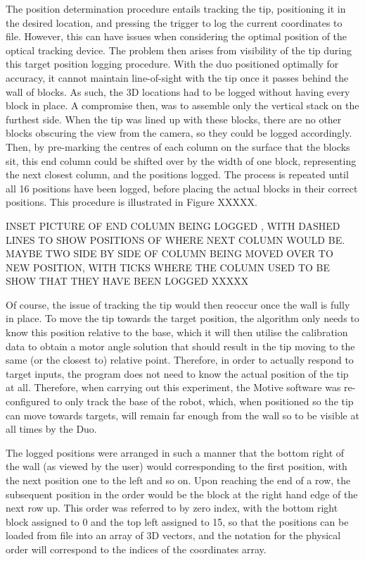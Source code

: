\documentclass[11pt]{article}
\begin{document}
The position determination procedure entails tracking the tip, positioning it in the desired location, and pressing the trigger to log the current coordinates to file. However, this can have issues when considering the optimal position of the optical tracking device. The problem then arises from visibility of the tip during this target position logging procedure. With the duo positioned optimally for accuracy, it cannot maintain line-of-sight with the tip once it passes behind the wall of blocks. As such, the 3D locations had to be logged without having every block in place. A compromise then, was to assemble only the vertical stack on the furthest side. When the tip was lined up with these blocks, there are no other blocks obscuring the view from the camera, so they could be logged accordingly. Then, by pre-marking the centres of each column on the surface that the blocks sit, this end column could be shifted over by the width of one block, representing the next closest column, and the positions logged. The process is repeated until all 16 positions have been logged, before placing the actual blocks in their correct positions. This procedure is illustrated in Figure XXXXX.

INSET PICTURE OF END COLUMN BEING LOGGED , WITH DASHED LINES TO SHOW POSITIONS OF WHERE NEXT COLUMN WOULD BE. MAYBE TWO SIDE BY SIDE OF COLUMN BEING MOVED OVER TO NEW POSITION, WITH TICKS WHERE THE COLUMN USED TO BE SHOW THAT THEY HAVE BEEN LOGGED XXXXX

Of course, the issue of tracking the tip would then reoccur once the wall is fully in place. To move the tip towards the target position, the algorithm only needs to know this position relative to the base, which it will then utilise the calibration data to obtain a motor angle solution that should result in the tip moving to the same (or the closest to) relative point. Therefore, in order to actually respond to target inputs, the program does not need to know the actual position of the tip at all. Therefore, when carrying out this experiment, the Motive software was re-configured to only track the base of the robot, which, when positioned so the tip can move towards targets, will remain far enough from the wall so to be visible at all times by the Duo. 

The logged positions were arranged in such a manner that the bottom right of the wall (as viewed by the user) would corresponding to the first position, with the next position one to the left and so on. Upon reaching the end of a row, the subsequent position in the order would be the block at the right hand edge of the next row up. This order was referred to by zero index, with the bottom right block assigned to 0 and the top left assigned to 15, so that the positions can be loaded from file into an array of 3D vectors, and the notation for the physical order will correspond to the indices of the coordinates array. 
\end{document}
